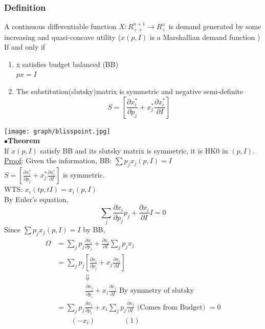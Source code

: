 \documentclass[letterpaper,13pt,single,pdftex]{scrartcl}
\begin{document}
\subsubsection{Definition}
A continuous differentiable function $X: R_{++}^{n+1} \rightarrow R^n_+$ is demand generated by some increasing and quasi-concave utility 
 ($x(p,I) $ is a Marshallian demand function )\\
 If and only if 
 \begin{enumerate}
     \item 
     x satisfies budget balanced (BB)\\
     $px = I$
     \item 
     The substitution(slutsky)matrix is symmetric and negative semi-definite\\
     \[S = [\frac{\partial x_i^*}{\partial p_j} +x_j^*\frac{\partial x_i^*}{\partial I}]\]

\end{enumerate} 
\texttt{[image: graph/blisspoint.jpg]}\\
$\bullet$\textbf{Theorem}\\
If $x(p,I)$ satisfy BB and its slutsky matrix is symmetric, it is HK0 in $(p,I)$.\\
\underline{Proof}: Given the information, BB: $\sum p_jx_j(p,I) = I$\\
$S = [\frac{\partial x_i^*}{\partial p_j} +x_j^*\frac{\partial x_i^*}{\partial I}]$ is symmetric. \\
WTS: $x_i(tp,tI) = x_i(p,I)$\\
By Euler's equation, \[\sum\limits_{j}\frac{\partial x_i}{\partial p_j} p_j + \frac{\partial x_i}{\partial I}I = 0\]
Since $\sum p_jx_j(p,I) = I$ by BB,
\begin{align*}
    \Omega  &= \sum\limits_{j}p_j \frac{\partial x_i}{\partial p_j} +\frac{\partial x_i}{\partial I}\sum\limits_{j}p_jx_j\\
    &= \sum\limits_{j}p_j [\frac{\partial x_i}{\partial p_j} + x_j\frac{\partial x_i}{\partial I}]\\
    &\qquad \qquad \Downarrow\\
    &\qquad \qquad \frac{\partial x_j}{\partial p_i} +x_i\frac{\partial x_j}{\partial I} \text{ By symmetry of slutsky}\\
    &= \sum\limits_{j}p_j \frac{\partial x_j}{\partial p_i} +x_i  \sum\limits_{j}p_j \frac{\partial x_j}{\partial I} \text{ (Comes from Budget) } = 0\\
    &\qquad (-x_i) \qquad \quad \quad (1)
\end{align*}
\end{document}
